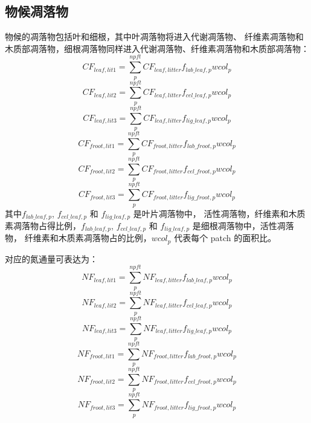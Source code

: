 \subsection{物候凋落物}\label{物候凋落物}
物候的凋落物包括叶和细根，其中叶凋落物将进入代谢凋落物、
纤维素凋落物和木质部凋落物，细根凋落物同样进入代谢凋落物、纤维素凋落物和木质部凋落物：
\begin{equation}
  CF_{leaf,lit1}=\sum_{p}^{npft}{CF_{leaf,litter}f_{lab\_{leaf},p}{wcol_p}}
\end{equation}
\begin{equation}
  CF_{leaf,lit2}=\sum_{p}^{npft}{CF_{leaf,litter}f_{cel\_{leaf},p}{wcol_p}}
\end{equation}
\begin{equation}
  CF_{leaf,lit3}=\sum_{p}^{npft}{CF_{leaf,litter}f_{lig\_{leaf},p}{wcol_p}}
\end{equation}
\begin{equation}
  CF_{froot,lit1}=\sum_{p}^{npft}{CF_{froot,litter}f_{lab\_{froot},p}{wcol_p}}
\end{equation}
\begin{equation}
  CF_{froot,lit2}=\sum_{p}^{npft}{CF_{froot,litter}f_{cel\_{froot},p}{wcol_p}}
\end{equation}
\begin{equation}
  CF_{froot,lit3}=\sum_{p}^{npft}{CF_{froot,litter}f_{lig\_{froot},p}{wcol_p}}
\end{equation}
其中$f_{lab\_{leaf},p}$, $f_{cel\_{leaf},p}$ 和 $f_{lig\_{leaf},p}$ 是叶片凋落物中，
活性凋落物，纤维素和木质素凋落物占得比例，$f_{lab\_{leaf},p}$, $f_{cel\_{leaf},p}$
和 $f_{lig\_{leaf},p}$ 是细根凋落物中，活性凋落物，
纤维素和木质素凋落物占的比例，${wcol_p}$ 代表每个 patch 的面积比。

对应的氮通量可表达为：
\begin{equation}
  NF_{leaf,lit1}=\sum_{p}^{npft}{NF_{leaf,litter}f_{lab\_{leaf},p}{wcol_p}}
\end{equation}
\begin{equation}
  NF_{leaf,lit2}=\sum_{p}^{npft}{NF_{leaf,litter}f_{cel\_{leaf},p}{wcol_p}}
\end{equation}
\begin{equation}
  NF_{leaf,lit3}=\sum_{p}^{npft}{NF_{leaf,litter}f_{lig\_{leaf},p}{wcol_p}}
\end{equation}
\begin{equation}
  NF_{froot,lit1}=\sum_{p}^{npft}{NF_{froot,litter}f_{lab\_{froot},p}{wcol_p}}
\end{equation}
\begin{equation}
  NF_{froot,lit2}=\sum_{p}^{npft}{NF_{froot,litter}f_{cel\_{froot},p}{wcol_p}}
\end{equation}
\begin{equation}
  NF_{froot,lit3}=\sum_{p}^{npft}{NF_{froot,litter}f_{lig\_{froot},p}{wcol_p}}
\end{equation}


